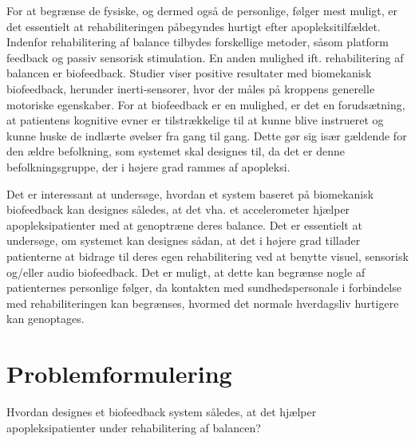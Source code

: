 For at begrænse de fysiske, og dermed også de personlige, følger mest muligt, er det essentielt at rehabiliteringen påbegyndes hurtigt efter apopleksitilfældet. Indenfor rehabilitering af balance tilbydes forskellige metoder, såsom platform feedback og passiv sensorisk stimulation. En anden mulighed ift. rehabilitering af balancen er biofeedback. Studier viser positive resultater med biomekanisk biofeedback, herunder inerti-sensorer, hvor der måles på kroppens generelle motoriske egenskaber. \cite{Giggins2013} For at biofeedback er en mulighed, er det en forudsætning, at patientens kognitive evner er tilstrækkelige til at kunne blive instrueret og kunne huske de indlærte øvelser fra gang til gang. \cite{Middaugh1989} Dette gør sig især gældende for den ældre befolkning, som systemet skal designes til, da det er denne befolkningsgruppe, der i højere grad rammes af apopleksi. \cite{Sundhedsstyrelsen2011}

Det er interessant at undersøge, hvordan et system baseret på biomekanisk biofeedback kan designes således, at det vha. et accelerometer hjælper apopleksipatienter med at genoptræne deres balance. Det er essentielt at undersøge, om systemet kan designes sådan, at det i højere grad tillader patienterne at bidrage til deres egen rehabilitering ved at benytte visuel, sensorisk og/eller audio biofeedback. Det er muligt, at dette kan begrænse nogle af patienternes personlige følger, da kontakten med sundhedspersonale i forbindelse med rehabiliteringen kan begrænses, hvormed det normale hverdagsliv hurtigere kan genoptages. 

\section{Problemformulering}
Hvordan designes et biofeedback system således, at det hjælper apopleksipatienter under rehabilitering af balancen?